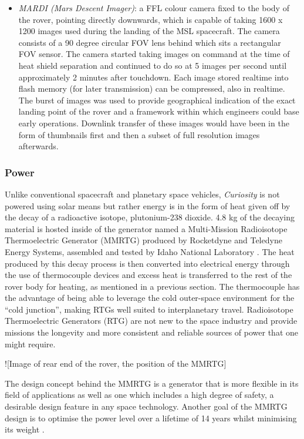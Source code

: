 \begin{itemize}
\begin{itemize}
            \item \textit{MARDI (Mars Descent Imager)}: a FFL colour camera fixed to the body of the rover, pointing directly downwards, which is capable of taking 1600 x 1200 images used during the landing of the MSL spacecraft. The camera consists of a 90 degree circular FOV lens behind which sits a rectangular FOV sensor. The camera started taking images on command at the time of heat shield separation and continued to do so at 5 images per second until approximately 2 minutes after touchdown. Each image stored realtime into flash memory (for later transmission) can be compressed, also in realtime. The burst of images was used to provide geographical indication of the exact landing point of the rover and a framework within which engineers could base early operations. Downlink transfer of these images would have been in the form of thumbnails first and then a subset of full resolution images afterwards.
          \end{itemize}
        \end{itemize}
      
      \subsubsection{Power}
        Unlike conventional spacecraft and planetary space vehicles, \textit{Curiosity} is not powered using solar means but rather energy is in the form of heat given off by the decay of a radioactive isotope, plutonium-238 dioxide. 4.8 kg of the decaying material is hosted inside of the generator named a Multi-Mission Radioisotope Thermoelectric Generator (MMRTG) produced by Rocketdyne and Teledyne Energy Systems, assembled and tested by Idaho National Laboratory \cite{inlgovfuelingcuriosity}. The heat produced by this decay process is then converted into electrical energy through the use of thermocouple devices and excess heat is transferred to the rest of the rover body for heating, as mentioned in a previous section. The thermocouple has the advantage of being able to leverage the cold outer-space environment for the ``cold junction'', making RTGs well suited to interplanetary travel. Radioisotope Thermoelectric Generators (RTG) are not new to the space industry and provide missions the longevity and more consistent and reliable sources of power that one might require.
        
        ![Image of rear end of the rover, the position of the MMRTG]
        
        The design concept behind the MMRTG is a generator that is more flexible in its field of applications as well as one which includes a high degree of safety, a desirable design feature in any space technology. Another goal of the MMRTG design is to optimise the power level over a lifetime of 14 years whilst minimising its weight \cite{srpsmmrtg}.
      
